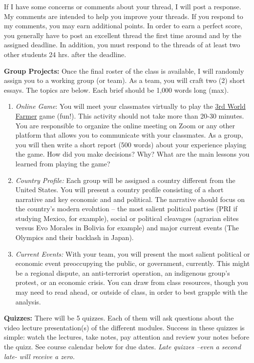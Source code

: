 \documentclass[11pt,]{article}
\begin{document}
If I have some concerns or comments about your thread, I will post a
response. My comments are intended to help you improve your threads. If
you respond to my comments, you may earn additional points. In order to
earn a perfect score, you generally have to post an excellent thread the
first time around and by the assigned deadline. In addition, you must
respond to the threads of at least two other students 24 hrs. after the
deadline.

\textbf{Group Projects:} Once the final roster of the class is
available, I will randomly assign you to a working group (or team). As a
team, you will craft two (2) short essays. The topics are below. Each
brief should be 1,000 words long (max).

\begin{enumerate}
\def\labelenumi{\arabic{enumi}.}
\item
  \emph{Online Game}: You will meet your classmates virtually to play
  the \href{https://3rdworldfarmer.org/}{3rd World Farmer} game (fun!).
  This activity should not take more than 20-30 minutes. You are
  responsible to organize the online meeting on Zoom or any other
  platform that allows you to communicate with your classmates. As a
  group, you will then write a short report (500 words) about your
  experience playing the game. How did you make decisions? Why? What are
  the main lessons you learned from playing the game?
\item
  \emph{Country Profile:} Each group will be assigned a country
  different from the United States. You will present a country profile
  consisting of a short narrative and key economic and and political.
  The narrative should focus on the country's modern evolution -- the
  most salient political parties (PRI if studying Mexico, for example),
  social or political cleavages (agrarian elites versus Evo Morales in
  Bolivia for example) and major current events (The Olympics and their
  backlash in Japan).
\item
  \emph{Current Events:} With your team, you will present the most
  salient political or economic event preoccupying the public, or
  government, currently. This might be a regional dispute, an
  anti-terrorist operation, an indigenous group's protest, or an
  economic crisis. You can draw from class resources, though you may
  need to read ahead, or outside of class, in order to best grapple with
  the analysis.
\end{enumerate}

\textbf{Quizzes:} There will be 5 quizzes. Each of them will ask
questions about the video lecture presentation(s) of the different
modules. Success in these quizzes is simple: watch the lectures, take
notes, pay attention and review your notes before the quizz. See course
calendar below for due dates. \emph{Late quizzes --even a second late-
will receive a zero.}
\end{document}
